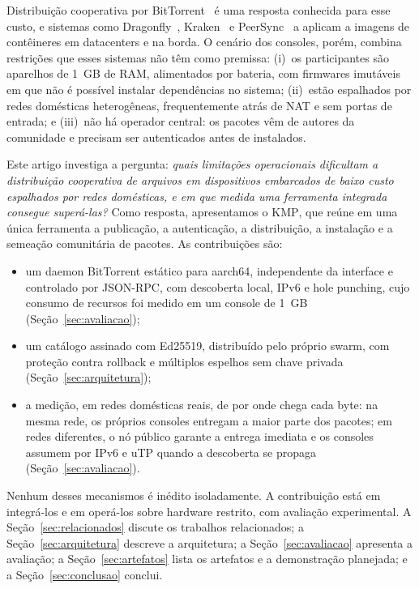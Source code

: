 \documentclass[12pt]{article}
\newcommand{\kmp}{\textsc{KMP}}
\begin{document}
Distribuição cooperativa por BitTorrent~\cite{cohen2003incentives,bep3} é uma
resposta conhecida para esse custo, e sistemas como
Dragonfly~\cite{dragonfly}, Kraken~\cite{kraken} e
PeerSync~\cite{deng2026peersync} a aplicam a imagens de contêineres em
datacenters e na borda. O cenário dos consoles, porém, combina restrições que
esses sistemas não têm como premissa:
(i)~os participantes são aparelhos de 1~GB de RAM, alimentados por bateria,
com firmwares imutáveis em que não é possível instalar dependências no
sistema;
(ii)~estão espalhados por redes domésticas heterogêneas, frequentemente atrás
de NAT e sem portas de entrada; e
(iii)~não há operador central: os pacotes vêm de autores da comunidade e
precisam ser autenticados antes de instalados.

Este artigo investiga a pergunta: \emph{quais limitações operacionais
dificultam a distribuição cooperativa de arquivos em dispositivos embarcados
de baixo custo espalhados por redes domésticas, e em que medida uma
ferramenta integrada consegue superá-las?} Como resposta, apresentamos o
\kmp{}, que reúne em uma única ferramenta a publicação, a autenticação, a
distribuição, a instalação e a semeação comunitária de pacotes. As
contribuições são:

\begin{itemize}
  \item um daemon BitTorrent estático para aarch64, independente da interface
        e controlado por JSON-RPC, com descoberta local, IPv6 e hole punching,
        cujo consumo de recursos foi medido em um console de 1~GB
        (Seção~\ref{sec:avaliacao});
  \item um catálogo assinado com Ed25519, distribuído pelo próprio swarm, com
        proteção contra rollback e múltiplos espelhos sem chave privada
        (Seção~\ref{sec:arquitetura});
  \item a medição, em redes domésticas reais, de por onde chega cada byte: na
        mesma rede, os próprios consoles entregam a maior parte dos pacotes; em
        redes diferentes, o nó público garante a entrega imediata e os consoles
        assumem por IPv6 e uTP quando a descoberta se propaga
        (Seção~\ref{sec:avaliacao}).
\end{itemize}

Nenhum desses mecanismos é inédito isoladamente. A contribuição está em
integrá-los e em operá-los sobre hardware restrito, com avaliação
experimental. A Seção~\ref{sec:relacionados} discute os trabalhos
relacionados; a Seção~\ref{sec:arquitetura} descreve a arquitetura; a
Seção~\ref{sec:avaliacao} apresenta a avaliação; a
Seção~\ref{sec:artefatos} lista os artefatos e a demonstração planejada; e a
Seção~\ref{sec:conclusao} conclui.
\end{document}
